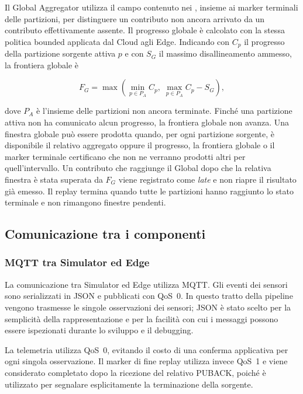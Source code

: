Il Global Aggregator utilizza il campo  contenuto nei
, insieme ai marker terminali delle partizioni,
per distinguere un contributo non ancora arrivato da un contributo
effettivamente assente. Il progresso globale è calcolato con la stessa
politica bounded applicata dal Cloud agli Edge. Indicando con $C_p$ il
progresso della partizione sorgente attiva $p$ e con $S_G$ il massimo
disallineamento ammesso, la frontiera globale è

\begin{equation}
F_G =
\max\left(
    \min_{p \in P_A} C_p,\;
    \max_{p \in P_A} C_p - S_G
\right),
\end{equation}

dove $P_A$ è l'insieme delle partizioni non ancora terminate. Finché una
partizione attiva non ha comunicato alcun progresso, la frontiera globale non
avanza. Una finestra globale può essere prodotta quando, per ogni partizione
sorgente, è disponibile il relativo aggregato oppure il progresso, la
frontiera globale o il marker terminale certificano che non ne verranno
prodotti altri per quell'intervallo. Un contributo che raggiunge il Global
dopo che la relativa finestra è stata superata da $F_G$ viene registrato come
\emph{late} e non riapre il risultato già emesso. Il replay termina quando
tutte le partizioni hanno raggiunto lo stato terminale e non rimangono
finestre pendenti.

\subsection{Comunicazione tra i componenti}

\subsubsection{MQTT tra Simulator ed Edge}

La comunicazione tra Simulator ed Edge utilizza MQTT. Gli eventi dei sensori
sono serializzati in JSON e pubblicati con QoS~0. In questo tratto della
pipeline vengono trasmesse le singole osservazioni dei sensori; JSON è stato
scelto per la semplicità della rappresentazione e per la facilità con cui i
messaggi possono essere ispezionati durante lo sviluppo e il debugging.

La telemetria utilizza QoS~0, evitando il costo di una conferma applicativa
per ogni singola osservazione. Il marker di fine replay utilizza invece
QoS~1 e viene considerato completato dopo la ricezione del relativo PUBACK,
poiché è utilizzato per segnalare esplicitamente la terminazione della
sorgente.

